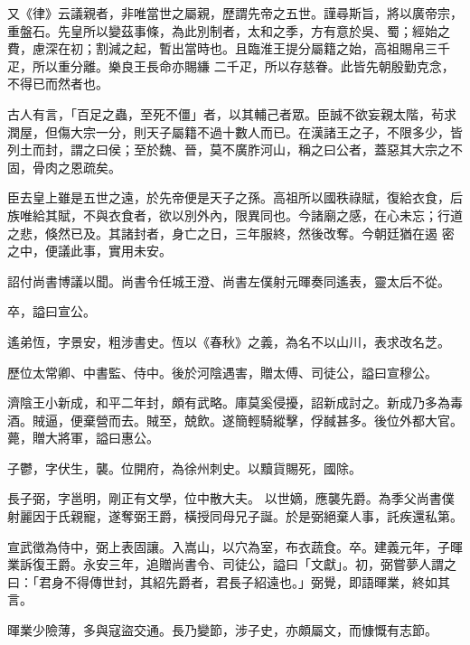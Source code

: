 \begin{pinyinscope}
 又《律》云議親者，非唯當世之屬親，歷謂先帝之五世。謹尋斯旨，將以廣帝宗，重盤石。先皇所以變茲事條，為此別制者，太和之季，方有意於吳、蜀；經始之費，慮深在初；割減之起，暫出當時也。且臨淮王提分屬籍之始，高祖賜帛三千疋，所以重分離。樂良王長命亦賜縑
 二千疋，所以存慈眷。此皆先朝殷勤克念，不得已而然者也。



 古人有言，「百足之蟲，至死不僵」者，以其輔己者眾。臣誠不欲妄親太階，茍求潤屋，但傷大宗一分，則天子屬籍不過十數人而已。在漢諸王之子，不限多少，皆列土而封，謂之曰侯；至於魏、晉，莫不廣胙河山，稱之曰公者，蓋惡其大宗之不固，骨肉之恩疏矣。



 臣去皇上雖是五世之遠，於先帝便是天子之孫。高祖所以國秩祿賦，復給衣食，后族唯給其賦，不與衣食者，欲以別外內，限異同也。今諸廟之感，在心未忘；行道之悲，倏然已及。其諸封者，身亡之日，三年服終，然後改奪。今朝廷猶在遏
 密之中，便議此事，實用未安。



 詔付尚書博議以聞。尚書令任城王澄、尚書左僕射元暉奏同遙表，靈太后不從。



 卒，謚曰宣公。



 遙弟恆，字景安，粗涉書史。恆以《春秋》之義，為名不以山川，表求改名芝。



 歷位太常卿、中書監、侍中。後於河陰遇害，贈太傅、司徒公，謚曰宣穆公。



 濟陰王小新成，和平二年封，頗有武略。庫莫奚侵擾，詔新成討之。新成乃多為毒酒。賊逼，便棄營而去。賊至，兢飲。遂簡輕騎縱擊，俘馘甚多。後位外都大官。薨，贈大將軍，謚曰惠公。



 子鬱，字伏生，襲。位開府，為徐州刺史。以黷貨賜死，國除。



 長子弼，字邕明，剛正有文學，位中散大夫。
 以世嫡，應襲先爵。為季父尚書僕射麗因于氏親寵，遂奪弼王爵，橫授同母兄子誕。於是弼絕棄人事，託疾還私第。



 宣武徵為侍中，弼上表固讓。入嵩山，以穴為室，布衣蔬食。卒。建義元年，子暉業訴復王爵。永安三年，追贈尚書令、司徒公，謚曰「文獻」。初，弼嘗夢人謂之曰：「君身不得傳世封，其紹先爵者，君長子紹遠也。」弼覺，即語暉業，終如其言。



 暉業少險薄，多與寇盜交通。長乃變節，涉子史，亦頗屬文，而慷慨有志節。




\end{pinyinscope}
